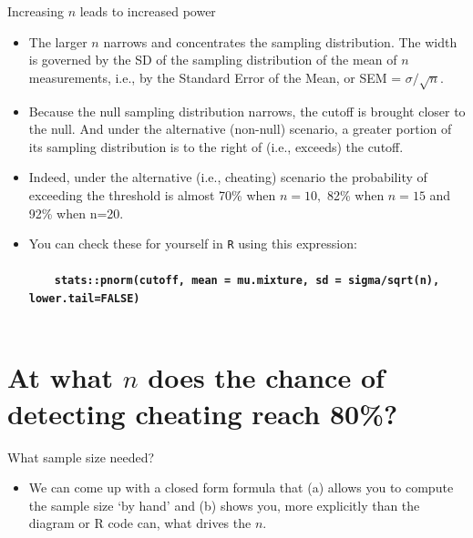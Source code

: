 \documentclass[10pt,handout]{beamer}\usepackage[]{graphicx}\usepackage[]{color}
\begin{document}
\begin{frame}{Increasing $n$ leads to increased power}
	\begin{itemize}
		\item The larger $n$ narrows and concentrates the sampling distribution. The width is governed by the SD of the sampling distribution of the mean of $n$ measurements, i.e., by the Standard Error of the Mean, or SEM = $\sigma/\sqrt{n}$.\pause 
		
		\item Because the null sampling distribution narrows, the cutoff is brought closer to the null.
		And under the alternative (non-null) scenario, a greater portion of its sampling distribution is to
		the right of (i.e., exceeds) the cutoff. \pause 
		
		\item Indeed, under the alternative (i.e., cheating) scenario the probability of exceeding the threshold  is almost 70\% when $n=10,$ 82\% when $n=15$ and 92\% when n=20. \pause 
		\item 
		You can check these for yourself in \texttt{R} using this expression:\\ \ \\
		{ \footnotesize
			\ \ \ \ \texttt{\textbf{stats::pnorm(cutoff, mean = mu.mixture, sd = sigma/sqrt(n), lower.tail=FALSE)} }  \\ \ \\
		} 
	\end{itemize}
\end{frame}


\section{At what $n$ does the chance of detecting cheating reach 80\%?}

\begin{frame}{What sample size needed?}
	
	\begin{itemize}
		\item We can come up with a closed form formula that (a) allows you to compute the sample size `by hand' and (b) shows you, more explicitly than the diagram or R code can, what drives the $n$.
		
	\end{itemize}
	
\end{frame}
\end{document}
